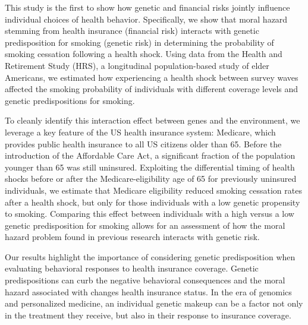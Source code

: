 \documentclass[12pt]{article}
\begin{document}


This study is the first to show how genetic and financial risks jointly influence individual choices of health behavior. Specifically, we show that moral hazard stemming from health insurance (financial risk) interacts with genetic predisposition for smoking (genetic risk) in determining the probability of smoking cessation following a health shock. Using data from the Health and Retirement Study (HRS), a longitudinal population-based study of elder Americans, we estimated how experiencing a health shock between survey waves affected the smoking probability of individuals with different coverage levels and genetic predispositions for smoking.

To cleanly identify this interaction effect between genes and the environment, we leverage a key feature of the US health insurance system: Medicare, which provides public health insurance to all US citizens older than 65. Before the introduction of the Affordable Care Act,\cite{Obama2016} a significant fraction of the population younger than 65 was still uninsured.\cite{Cohen2009,Barnett2016} Exploiting the differential timing of health shocks before or after the Medicare-eligibility age of 65 for previously uninsured individuals, we estimate that Medicare eligibility reduced smoking cessation rates after a health shock, but only for those individuals with a low genetic propensity to smoking. Comparing this effect between individuals with a high versus a low genetic predisposition for smoking allows for an assessment of how the moral hazard problem found in previous research interacts with genetic risk.


Our results highlight the importance of considering genetic predisposition when evaluating behavioral responses to health insurance coverage.\cite{Brock1993,Morrison2005} Genetic predispositions can curb the negative behavioral consequences and the moral hazard associated with changes health insurance status. In the era of genomics and personalized medicine,\cite{Khera2018,Torkamani2018,Schork2018,Ritz2017} an individual genetic makeup can be a factor not only in the treatment they receive, but also in their response to insurance coverage.
\end{document}
